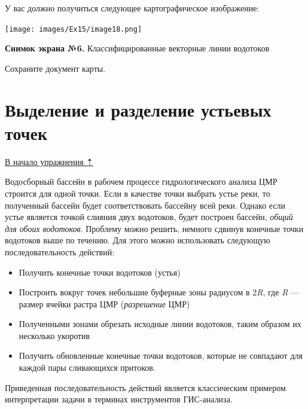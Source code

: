 \documentclass[12pt,]{book}
\begin{document}
У вас должно получиться следующее картографическое изображение:

\texttt{[image: images/Ex15/image18.png]}

\textbf{Снимок экрана №6.} Классифицированные векторные линии водотоков

Сохраните документ карты.

\hypertarget{dem-mouth}{%
\section{Выделение и разделение устьевых точек}\label{dem-mouth}}

\protect\hyperlink{dem}{В начало упражнения ⇡}

Водосборный бассейн в рабочем процессе гидрологического анализа ЦМР строится для одной точки. Если в качестве точки выбрать устье реки, то полученный бассейн будет соответствовать бассейну всей реки. Однако если устье является точкой слияния двух водотоков, будет построен бассейн, \emph{общий для обоих водотоков}. Проблему можно решить, немного сдвинув конечные точки водотоков выше по течению. Для этого можно использовать следующую последовательность действий:

\begin{itemize}
\item
  Получить конечные точки водотоков (устья)
\item
  Построить вокруг точек небольшие буферные зоны радиусом в 2\emph{R}, где \emph{R} --- размер ячейки растра ЦМР (\emph{разрешение} ЦМР)
\item
  Полученными зонами обрезать исходные линии водотоков, таким образом их несколько укоротив
\item
  Получить обновленные конечные точки водотоков, которые не совпадают для каждой пары сливающихся притоков.
\end{itemize}

Приведенная последовательность действий является классическим примером интерпретации задачи в терминах инструментов ГИС-анализа.
\end{document}
